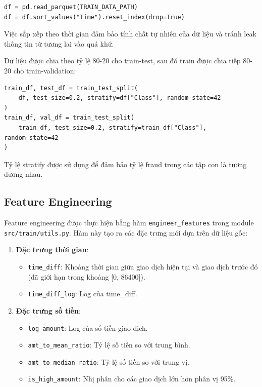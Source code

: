 \begin{verbatim}
df = pd.read_parquet(TRAIN_DATA_PATH)
df = df.sort_values("Time").reset_index(drop=True)
\end{verbatim}

Việc sắp xếp theo thời gian đảm bảo tính chất tự nhiên của dữ liệu và tránh leak thông tin từ tương lai vào quá khứ.

Dữ liệu được chia theo tỷ lệ 80-20 cho train-test, sau đó train được chia tiếp 80-20 cho train-validation:

\begin{verbatim}
train_df, test_df = train_test_split(
    df, test_size=0.2, stratify=df["Class"], random_state=42
)
train_df, val_df = train_test_split(
    train_df, test_size=0.2, stratify=train_df["Class"], random_state=42
)
\end{verbatim}

Tỷ lệ stratify được sử dụng để đảm bảo tỷ lệ fraud trong các tập con là tương đương nhau.

\subsection{Feature Engineering}

Feature engineering được thực hiện bằng hàm \texttt{engineer\_features} trong module \texttt{src/train/utils.py}. Hàm này tạo ra các đặc trưng mới dựa trên dữ liệu gốc:

\begin{enumerate}
    \item \textbf{Đặc trưng thời gian}:
    \begin{itemize}
        \item \texttt{time\_diff}: Khoảng thời gian giữa giao dịch hiện tại và giao dịch trước đó (đã giới hạn trong khoảng [0, 86400]).
        \item \texttt{time\_diff\_log}: Log của time\_diff.
    \end{itemize}
    
    \item \textbf{Đặc trưng số tiền}:
    \begin{itemize}
        \item \texttt{log\_amount}: Log của số tiền giao dịch.
        \item \texttt{amt\_to\_mean\_ratio}: Tỷ lệ số tiền so với trung bình.
        \item \texttt{amt\_to\_median\_ratio}: Tỷ lệ số tiền so với trung vị.
        \item \texttt{is\_high\_amount}: Nhị phân cho các giao dịch lớn hơn phân vị 95\%.
    \end{itemize}
\end{enumerate}


